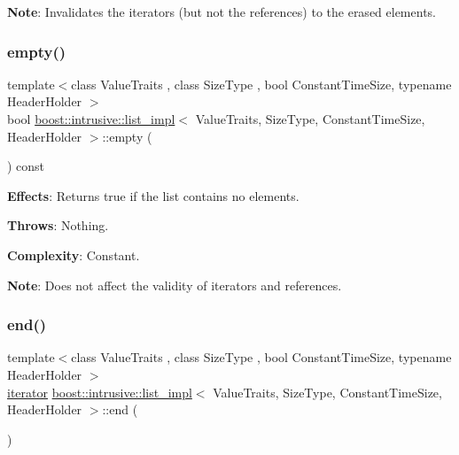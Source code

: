{\bfseries Note}\+: Invalidates the iterators (but not the references) to the erased elements. \mbox{\label{classboost_1_1intrusive_1_1list__impl_afe2d286a6230f944fe3aa5a231d01e0a}} 
\subsubsection{\texorpdfstring{empty()}{empty()}}
{\footnotesize\ttfamily template$<$class Value\+Traits , class Size\+Type , bool Constant\+Time\+Size, typename Header\+Holder $>$ \\
bool \hyperlink{classboost_1_1intrusive_1_1list__impl}{boost\+::intrusive\+::list\+\_\+impl}$<$ Value\+Traits, Size\+Type, Constant\+Time\+Size, Header\+Holder $>$\+::empty (\begin{DoxyParamCaption}{ }\end{DoxyParamCaption}) const\hspace{0.3cm}{\ttfamily [inline]}}

{\bfseries Effects}\+: Returns true if the list contains no elements.

{\bfseries Throws}\+: Nothing.

{\bfseries Complexity}\+: Constant.

{\bfseries Note}\+: Does not affect the validity of iterators and references. \mbox{\label{classboost_1_1intrusive_1_1list__impl_af2a454471fced6d4b2fb899c50bbee67}} 
\subsubsection{\texorpdfstring{end()}{end()}\hspace{0.1cm}{\footnotesize\ttfamily [1/2]}}
{\footnotesize\ttfamily template$<$class Value\+Traits , class Size\+Type , bool Constant\+Time\+Size, typename Header\+Holder $>$ \\
\hyperlink{classboost_1_1intrusive_1_1list__impl_a15c0189bf62eb9fb98bc07ef10b8cb23}{iterator} \hyperlink{classboost_1_1intrusive_1_1list__impl}{boost\+::intrusive\+::list\+\_\+impl}$<$ Value\+Traits, Size\+Type, Constant\+Time\+Size, Header\+Holder $>$\+::end (\begin{DoxyParamCaption}{ }\end{DoxyParamCaption})\hspace{0.3cm}{\ttfamily [inline]}}

